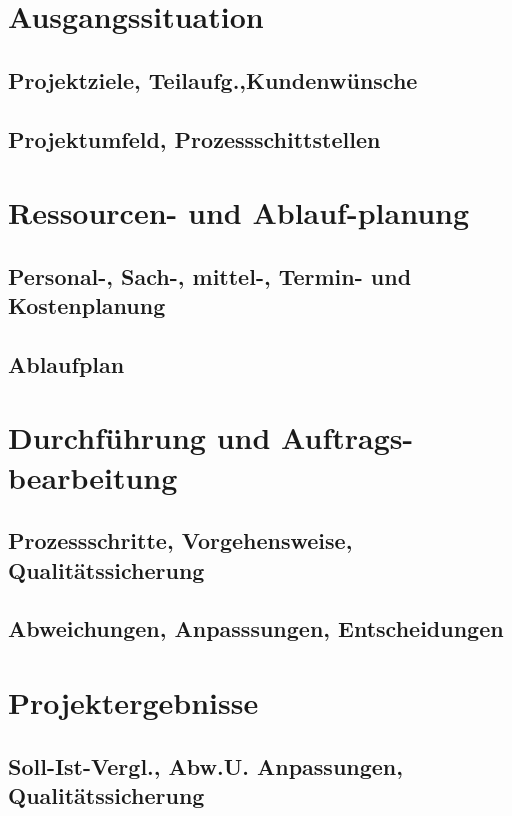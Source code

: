 \documentclass[10pt,a4paper]{article}
\author{Your Name}
\date{\today}
\begin{document}
\section{Ausgangssituation}
\subsection{Projektziele, Teilaufg.,Kundenw\"unsche }
\subsection{Projektumfeld, Prozessschittstellen}
\section{Ressourcen- und Ablauf-planung}
\subsection{Personal-, Sach-, mittel-, Termin- und Kostenplanung}
\subsection{Ablaufplan}
\section{Durchführung und Auftrags-bearbeitung}
\subsection{Prozessschritte, Vorgehensweise, Qualit\"atssicherung}
\subsection{Abweichungen, Anpasssungen, Entscheidungen}
\section{Projektergebnisse}
\subsection{Soll-Ist-Vergl., Abw.U. Anpassungen, Qualit\"atssicherung}
\end{document}
